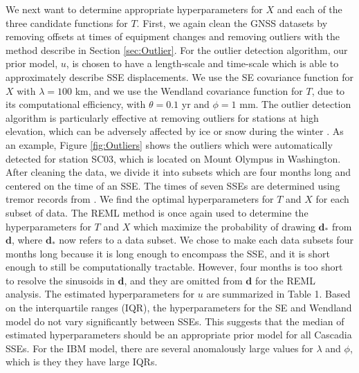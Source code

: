 \documentclass[10pt,a4paper]{article}
\begin{document}
We next want to determine appropriate hyperparameters for $X$ and each of the three candidate functions for $T$. First, we again clean the GNSS datasets by removing offsets at times of equipment changes and removing outliers with the method describe in Section \ref{sec:Outlier}. For the outlier detection algorithm, our prior model, $u$, is chosen to have a length-scale and time-scale which is able to approximately describe SSE displacements. We use the SE covariance function for $X$ with $\lambda = 100$ km, and we use the Wendland covariance function for $T$, due to its computational efficiency, with $\theta = 0.1$ yr and $\phi = 1$ mm. The outlier detection algorithm is particularly effective at removing outliers for stations at high elevation, which can be adversely affected by ice or snow during the winter \citep{Lisowski2008}. As an example, Figure \ref{fig:Outliers} shows the outliers which were automatically detected for station SC03, which is located on Mount Olympus in Washington.  After cleaning the data, we divide it into subsets which are four months long and centered on the time of an SSE. The times of seven SSEs are determined using tremor records from \cite{Wech2010}. We find the optimal hyperparameters for $T$ and $X$ for each subset of data. The REML method is once again used to determine the hyperparameters for $T$ and $X$ which maximize the probability of drawing $\bm{d}_*$ from $\bm{d}$, where $\bm{d}_*$ now refers to a data subset. We chose to make each data subsets four months long because it is long enough to encompass the SSE, and it is short enough to still be computationally tractable. However, four months is too short to resolve the sinusoids in $\bm{d}$, and they are omitted from $\bm{d}$ for the REML analysis. The estimated hyperparameters for $u$ are summarized in Table 1. Based on the interquartile ranges (IQR), the hyperparameters for the SE and Wendland model do not vary significantly between SSEs. This suggests that the median of estimated hyperparameters should be an appropriate prior model for all Cascadia SSEs. For the IBM model, there are several anomalously large values for $\lambda$ and $\phi$, which is they they have large IQRs.   
\end{document}
